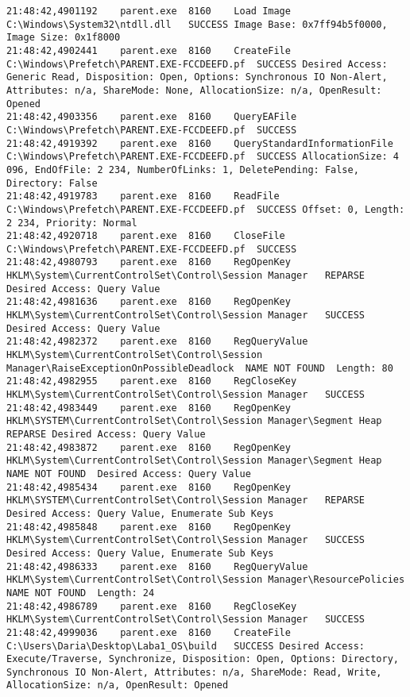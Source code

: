 \begin{verbatim}
21:48:42,4901192	parent.exe	8160	Load Image	C:\Windows\System32\ntdll.dll	SUCCESS	Image Base: 0x7ff94b5f0000, Image Size: 0x1f8000
21:48:42,4902441	parent.exe	8160	CreateFile	C:\Windows\Prefetch\PARENT.EXE-FCCDEEFD.pf	SUCCESS	Desired Access: Generic Read, Disposition: Open, Options: Synchronous IO Non-Alert, Attributes: n/a, ShareMode: None, AllocationSize: n/a, OpenResult: Opened
21:48:42,4903356	parent.exe	8160	QueryEAFile	C:\Windows\Prefetch\PARENT.EXE-FCCDEEFD.pf	SUCCESS	
21:48:42,4919392	parent.exe	8160	QueryStandardInformationFile	C:\Windows\Prefetch\PARENT.EXE-FCCDEEFD.pf	SUCCESS	AllocationSize: 4 096, EndOfFile: 2 234, NumberOfLinks: 1, DeletePending: False, Directory: False
21:48:42,4919783	parent.exe	8160	ReadFile	C:\Windows\Prefetch\PARENT.EXE-FCCDEEFD.pf	SUCCESS	Offset: 0, Length: 2 234, Priority: Normal
21:48:42,4920718	parent.exe	8160	CloseFile	C:\Windows\Prefetch\PARENT.EXE-FCCDEEFD.pf	SUCCESS	
21:48:42,4980793	parent.exe	8160	RegOpenKey	HKLM\System\CurrentControlSet\Control\Session Manager	REPARSE	Desired Access: Query Value
21:48:42,4981636	parent.exe	8160	RegOpenKey	HKLM\System\CurrentControlSet\Control\Session Manager	SUCCESS	Desired Access: Query Value
21:48:42,4982372	parent.exe	8160	RegQueryValue	HKLM\System\CurrentControlSet\Control\Session Manager\RaiseExceptionOnPossibleDeadlock	NAME NOT FOUND	Length: 80
21:48:42,4982955	parent.exe	8160	RegCloseKey	HKLM\System\CurrentControlSet\Control\Session Manager	SUCCESS	
21:48:42,4983449	parent.exe	8160	RegOpenKey	HKLM\SYSTEM\CurrentControlSet\Control\Session Manager\Segment Heap	REPARSE	Desired Access: Query Value
21:48:42,4983872	parent.exe	8160	RegOpenKey	HKLM\System\CurrentControlSet\Control\Session Manager\Segment Heap	NAME NOT FOUND	Desired Access: Query Value
21:48:42,4985434	parent.exe	8160	RegOpenKey	HKLM\SYSTEM\CurrentControlSet\Control\Session Manager	REPARSE	Desired Access: Query Value, Enumerate Sub Keys
21:48:42,4985848	parent.exe	8160	RegOpenKey	HKLM\System\CurrentControlSet\Control\Session Manager	SUCCESS	Desired Access: Query Value, Enumerate Sub Keys
21:48:42,4986333	parent.exe	8160	RegQueryValue	HKLM\System\CurrentControlSet\Control\Session Manager\ResourcePolicies	NAME NOT FOUND	Length: 24
21:48:42,4986789	parent.exe	8160	RegCloseKey	HKLM\System\CurrentControlSet\Control\Session Manager	SUCCESS	
21:48:42,4999036	parent.exe	8160	CreateFile	C:\Users\Daria\Desktop\Laba1_OS\build	SUCCESS	Desired Access: Execute/Traverse, Synchronize, Disposition: Open, Options: Directory, Synchronous IO Non-Alert, Attributes: n/a, ShareMode: Read, Write, AllocationSize: n/a, OpenResult: Opened

\end{verbatim}
